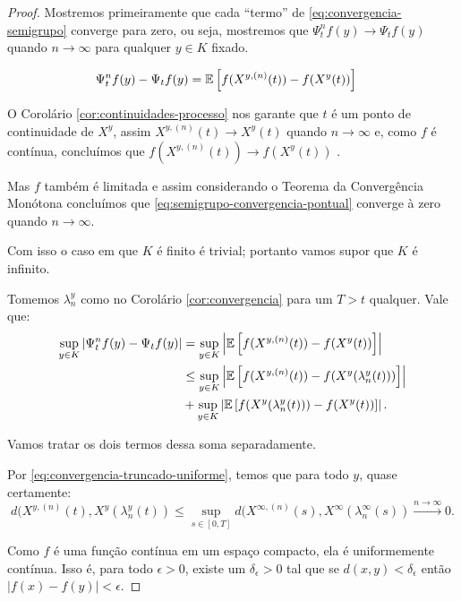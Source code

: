 \begin{proof}

  Mostremos primeiramente que cada ``termo'' de
  \eqref{eq:convergencia-semigrupo} converge para zero, ou seja,
  mostremos que $\Psi^n_t f (y) \to \Psi_t f(y)$ quando $n \to \infty$
  para qualquer $y \in K$ fixado.

  \begin{align}
    \label{eq:semigrupo-convergencia-pontual}
    \Psi^n_t f (y) -\Psi_t f(y) &=
    {\mathbb{E}} \left[
      f(X^{y, (n)}(t)) - f(X^y(t))
    \right]
  \end{align}

  O Corolário \ref{cor:continuidades-processo} nos garante que $t$ é
  \qc um ponto de continuidade de $X^y$, assim $X^{y, (n)}(t) \to
  X^y(t)$ \qc quando $n \to \infty$ e, como $f$ é contínua, concluímos
  que $f(X^{y, (n)}(t)) \to f(X^y(t))$ \qc.

  Mas $f$ também é limitada e assim considerando o Teorema da
  Convergência Monótona concluímos que
  \eqref{eq:semigrupo-convergencia-pontual} converge à zero quando $n
  \to \infty$.

  Com isso o caso em que $K$ é finito é trivial; portanto vamos supor
  que $K$ é infinito.

  Tomemos $\lambda_n^y$ como no Corolário \ref{cor:convergencia} para
  um $T > t$ qualquer. Vale que:
  \begin{align}
    \label{eq:esperancas-markov}
    \sup_{y \in K} | \Psi^n_t f (y) - \Psi_t f(y) | 
    &= \sup_{y \in K} \left\lvert {\mathbb{E}} \left[f(X^{y, (n)}(t)) -
        f(X^y(t)) \right]\right\rvert \\
    &\leq \sup_{y\in K}\left\lvert {\mathbb{E}} \left[f(X^{y, (n)}(t)) -
        f(X^y(\lambda_n^y(t))) \right]
    \right\rvert \notag \\
    &+ \sup_{y\in K}\left\lvert {\mathbb{E}} \left[f(X^y(\lambda_n^y(t))) -
        f(X^y(t)) \right] \right\rvert. \notag
  \end{align}

  Vamos tratar os dois termos dessa soma separadamente.

  Por \eqref{eq:convergencia-truncado-uniforme}, temos que para todo
  $y$, quase certamente:
  \begin{equation}
    \label{eq:dist-uniforme}
    d(X^{y, (n)}(t), X^y(\lambda_n^y(t)) \leq
    \sup_{s \in [0, T]} d(X^{\infty, (n)}(s), X^\infty(\lambda_n^\infty(s))
    \xrightarrow{n\to\infty} 0.
  \end{equation}
  
  Como $f$ é uma função contínua em um espaço compacto,  ela é
  uniformemente contínua. Isso é, para todo $\epsilon > 0$, existe um
  $\delta_\epsilon > 0$ tal que se $d(x, y) < \delta_\epsilon$ então
  $|f(x)-f(y)| < \epsilon$.


\end{proof}
